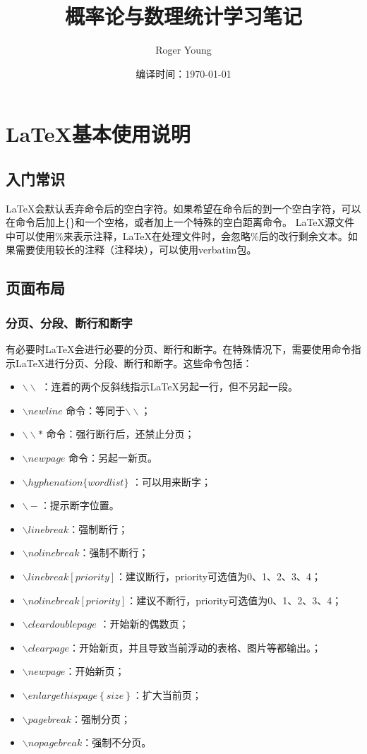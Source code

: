 \documentclass[11pt]{book}
\title{概率论与数理统计学习笔记}
\author{Roger Young}
\date{编译时间：\today}
\newcounter{#2}
\newcounter{#2}[#1]
\numberwithin{#2}{#1}
\begin{document}
	\maketitle
	\tableofcontents
	\newpage
	
	\chapter{\LaTeX 基本使用说明}
	\section{入门常识}
	
	\LaTeX 会默认丢弃命令后的空白字符。如果希望在命令后的到一个空白字符，可以在命令后加上\{\}和一个空格，或者加上一个特殊的空白距离命令。
	\LaTeX 源文件中可以使用\%来表示注释，\LaTeX 在处理文件时，会忽略\%后的改行剩余文本。如果需要使用较长的注释（注释块），可以使用verbatim包。
		\section{页面布局}
				\subsection{分页、分段、断行和断字}
		有必要时\LaTeX 会进行必要的分页、断行和断字。在特殊情况下，需要使用命令指示\LaTeX 进行分页、分段、断行和断字。这些命令包括：
		\begin{itemize}
			\item $ \backslash \backslash $ ：连着的两个反斜线指示\LaTeX 另起一行，但不另起一段。
			\item $ \backslash newline $ 命令：等同于$ \backslash \backslash $；
			\item $ \backslash \backslash* $ 命令：强行断行后，还禁止分页；
			\item $ \backslash newpage $ 命令：另起一新页。
			\item $ \backslash hyphenation\{word list\} $ ：可以用来断字；
			\item $ \backslash- $：提示断字位置。
			\item $ \backslash linebreak $：强制断行；
			\item $ \backslash nolinebreak $：强制不断行；
			\item $ \backslash linebreak[priority] $：建议断行，priority可选值为0、1、2、3、4；
			\item $ \backslash nolinebreak[priority] $：建议不断行，priority可选值为0、1、2、3、4；
			\item $ \backslash cleardoublepage $ ：开始新的偶数页；
			\item $ \backslash clearpage $：开始新页，并且导致当前浮动的表格、图片等都输出。；
			\item $ \backslash newpage $：开始新页；
			\item $ \backslash enlargethispage\left\lbrace size\right\rbrace  $：扩大当前页；
			\item $ \backslash pagebreak $：强制分页；
			\item $ \backslash nopagebreak $：强制不分页。
			
		\end{itemize}
\end{document}
